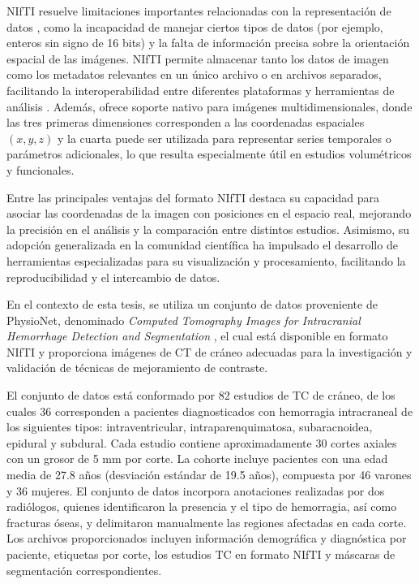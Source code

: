 NIfTI resuelve limitaciones importantes relacionadas con la representación de datos \cite{cox2004nifti}, como la incapacidad de manejar ciertos tipos de datos (por ejemplo, enteros sin signo de 16 bits) y la falta de información precisa sobre la orientación espacial de las imágenes. NIfTI permite almacenar tanto los datos de imagen como los metadatos relevantes en un único archivo o en archivos separados, facilitando la interoperabilidad entre diferentes plataformas y herramientas de análisis . Además, ofrece soporte nativo para imágenes multidimensionales, donde las tres primeras dimensiones corresponden a las coordenadas espaciales $ (x, y, z) $ y la cuarta puede ser utilizada para representar series temporales o parámetros adicionales, lo que resulta especialmente útil en estudios volumétricos y funcionales.

Entre las principales ventajas del formato NIfTI destaca su capacidad para asociar las coordenadas de la imagen con posiciones en el espacio real, mejorando la precisión en el análisis y la comparación entre distintos estudios. Asimismo, su adopción generalizada en la comunidad científica ha impulsado el desarrollo de herramientas especializadas para su visualización y procesamiento, facilitando la reproducibilidad y el intercambio de datos.

En el contexto de esta tesis, se utiliza un conjunto de datos proveniente de PhysioNet, denominado \emph{Computed Tomography Images for Intracranial Hemorrhage Detection and Segmentation} \cite{DatasetPhysionet,DatasetOriginalArticle}, el cual está disponible en formato NIfTI y proporciona imágenes de CT de cráneo adecuadas para la investigación y validación de técnicas de mejoramiento de contraste.

El conjunto de datos está conformado por 82 estudios de TC de cráneo, de los cuales 36 corresponden a pacientes diagnosticados con hemorragia intracraneal de los siguientes tipos: intraventricular, intraparenquimatosa, subaracnoidea, epidural y subdural. Cada estudio contiene aproximadamente 30 cortes axiales con un grosor de 5 mm por corte. La cohorte incluye pacientes con una edad media de 27.8 años (desviación estándar de 19.5 años), compuesta por 46 varones y 36 mujeres. El conjunto de datos incorpora anotaciones realizadas por dos radiólogos, quienes identificaron la presencia y el tipo de hemorragia, así como fracturas óseas, y delimitaron manualmente las regiones afectadas en cada corte. Los archivos proporcionados incluyen información demográfica y diagnóstica por paciente, etiquetas por corte, los estudios TC en formato NIfTI y máscaras de segmentación correspondientes.


